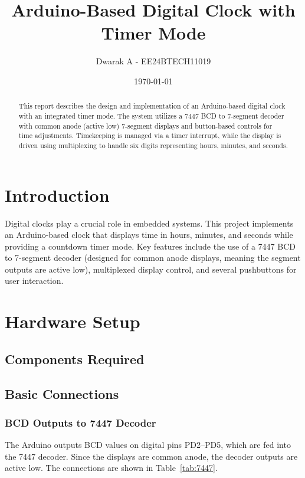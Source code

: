 \documentclass[a4paper,12pt]{article}
\title{Arduino-Based Digital Clock with Timer Mode}
\author{Dwarak A - EE24BTECH11019}
\date{\today}
\begin{document}
\maketitle

\begin{abstract}
This report describes the design and implementation of an Arduino-based digital clock with an integrated timer mode. The system utilizes a 7447 BCD to 7-segment decoder with common anode (active low) 7-segment displays and button-based controls for time adjustments. Timekeeping is managed via a timer interrupt, while the display is driven using multiplexing to handle six digits representing hours, minutes, and seconds.
\end{abstract}

\section{Introduction}
Digital clocks play a crucial role in embedded systems. This project implements an Arduino-based clock that displays time in hours, minutes, and seconds while providing a countdown timer mode. Key features include the use of a 7447 BCD to 7-segment decoder (designed for common anode displays, meaning the segment outputs are active low), multiplexed display control, and several pushbuttons for user interaction.

\section{Hardware Setup}
\subsection{Components Required}
\newpage

\subsection{Basic Connections}

\subsubsection{BCD Outputs to 7447 Decoder}
The Arduino outputs BCD values on digital pins PD2--PD5, which are fed into the 7447 decoder. Since the displays are common anode, the decoder outputs are active low. The connections are shown in Table~\ref{tab:7447}.

\end{document}
